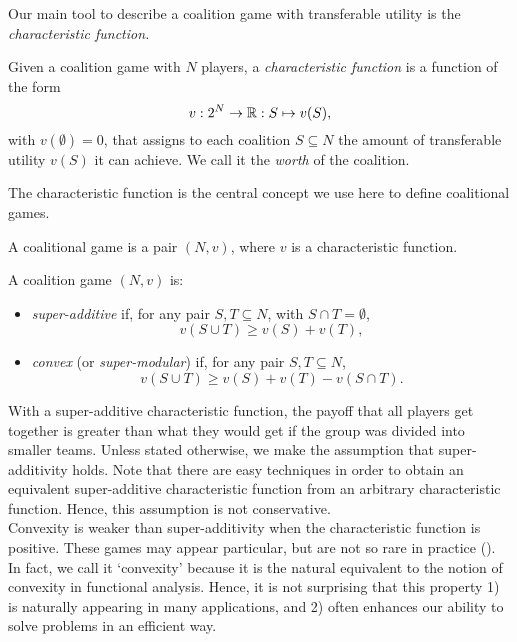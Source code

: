 Our main tool to describe a coalition game with transferable utility is the \emph{characteristic function.}
\begin{definition}
Given a coalition game with $N$ players, a \emph{characteristic function} is a function of the form
$$v : 2^N \rightarrow \mathbb{R}: S \mapsto v(S), $$
with $v(\emptyset) = 0$, that assigns to each coalition $S \subseteq N$ the amount of transferable utility $v(S)$ it can achieve.  We call it the \emph{worth} of the coalition.
\end{definition}
The characteristic function is the central concept we use here to define coalitional games.
\begin{definition}
A coalitional game is a pair $(N,v)$, where $v$ is a characteristic function.
\end{definition}
\begin{definition}
A coalition game $(N,v)$ is:
\begin{itemize}
\item \emph{super-additive} if, for any pair $S,T \subseteq N$, with $S \cap T = \emptyset$,
$$v(S \cup T) \geq v(S) + v(T), $$
\item \emph{convex} (or \emph{super-modular}) if,  for any pair $S,T \subseteq N$,
$$v(S \cup T) \geq v(S) + v(T) - v(S \cap T). $$
\end{itemize}
\end{definition}
With a super-additive characteristic function, the payoff that all players get together is greater than what they would get if the group was divided into smaller teams. Unless stated otherwise, we make the assumption that super-additivity holds. Note that there are easy techniques in order to obtain an equivalent super-additive characteristic function from an arbitrary characteristic function.  Hence, this assumption is not conservative.\\
Convexity is weaker than super-additivity when the characteristic function is positive. These games may appear particular, but are not so rare in practice (\cite{ShLeMSAG}). In fact, we call it `convexity' because it is the natural equivalent to the notion of convexity in functional analysis.  Hence, it is not surprising that this property 1) is naturally appearing in many applications, and 2) often enhances our ability to solve problems in an efficient way.
